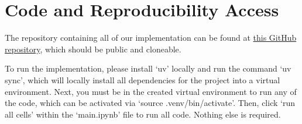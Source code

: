 \documentclass[12pt,letterpaper]{article}
\begin{document}
\newpage

\section{Code and Reproducibility Access}


The repository containing all of our implementation can be found at \href{https://github.com/kevintang6142/data-mining-project-1/tree/main}{this GitHub repository}, which should be public and cloneable.

To run the implementation, please install `uv' locally and run the command `uv sync', which will locally install all dependencies for the project into a virtual environment. Next, you must be in the created virtual environment to run any of the code, which can be activated via `source .venv/bin/activate'. Then, click `run all cells' within the `main.ipynb' file to run all code. Nothing else is required.
\end{document}
